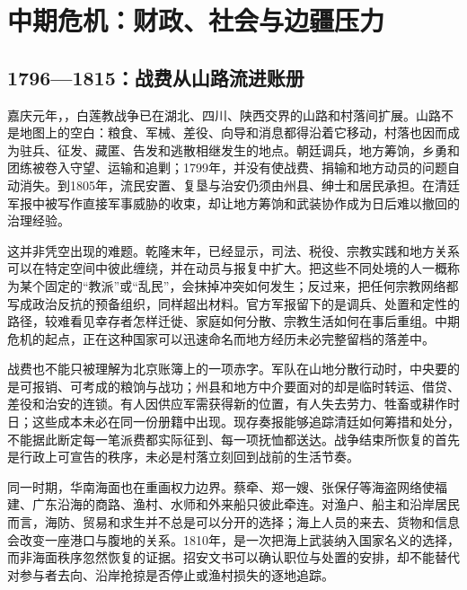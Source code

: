 \chapter{中期危机：财政、社会与边疆压力}
\label{ch:mid-qing-crisis}


\section{1796—1815：战费从山路流进账册}

嘉庆元年，，白莲教战争已在湖北、四川、陕西交界的山路和村落间扩展。山路不是地图上的空白：粮食、军械、差役、向导和消息都得沿着它移动，村落也因而成为驻兵、征发、藏匿、告发和逃散相继发生的地点。朝廷调兵，地方筹饷，乡勇和团练被卷入守望、运输和追剿；1799年，并没有使战费、捐输和地方动员的问题自动消失。到1805年，流民安置、复垦与治安仍须由州县、绅士和居民承担。在清廷军报中被写作直接军事威胁的收束，却让地方筹饷和武装协作成为日后难以撤回的治理经验。

这并非凭空出现的难题。乾隆末年，已经显示，司法、税役、宗教实践和地方关系可以在特定空间中彼此缠绕，并在动员与报复中扩大。把这些不同处境的人一概称为某个固定的“教派”或“乱民”，会抹掉冲突如何发生；反过来，把任何宗教网络都写成政治反抗的预备组织，同样超出材料。官方军报留下的是调兵、处置和定性的路径，较难看见幸存者怎样迁徙、家庭如何分散、宗教生活如何在事后重组。中期危机的起点，正在这种国家可以迅速命名而地方经历未必完整留档的落差中。

战费也不能只被理解为北京账簿上的一项赤字。军队在山地分散行动时，中央要的是可报销、可考成的粮饷与战功；州县和地方中介要面对的却是临时转运、借贷、差役和治安的连锁。有人因供应军需获得新的位置，有人失去劳力、牲畜或耕作时日；这些成本未必在同一份册籍中出现。现存奏报能够追踪清廷如何筹措和处分，不能据此断定每一笔派费都实际征到、每一项抚恤都送达。战争结束所恢复的首先是行政上可宣告的秩序，未必是村落立刻回到战前的生活节奏。

同一时期，华南海面也在重画权力边界。蔡牵、郑一嫂、张保仔等海盗网络使福建、广东沿海的商路、渔村、水师和外来船只彼此牵连。对渔户、船主和沿岸居民而言，海防、贸易和求生并不总是可以分开的选择；海上人员的来去、货物和信息会改变一座港口与腹地的关系。1810年，是一次把海上武装纳入国家名义的选择，而非海面秩序忽然恢复的证据。招安文书可以确认职位与处置的安排，却不能替代对参与者去向、沿岸抢掠是否停止或渔村损失的逐地追踪。

